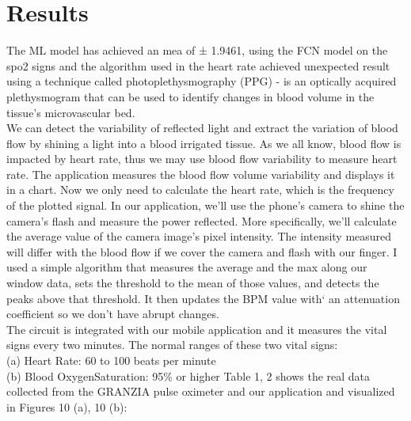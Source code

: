 \documentclass{bmcart}
\begin{document}
\section*{Results}
The ML model has achieved an mea of ± 1.9461, using the FCN model on the spo2
signs and the algorithm used in the heart rate achieved unexpected result using
a technique called photoplethysmography (PPG) - is an optically acquired
plethysmogram that can be used to identify changes in blood volume in the
tissue's microvascular bed.\\
We can detect the variability of reflected light and extract the variation of
blood flow by shining a light into a blood irrigated tissue. As we all know,
blood flow is impacted by heart rate, thus we may use blood flow variability to
measure heart rate. The application measures the blood flow volume variability
and displays it in a chart. Now we only need to calculate the heart rate, which
is the frequency of the plotted signal. In our application, we'll use the
phone's camera to shine the camera's flash and measure the power reflected. More
specifically, we'll calculate the average value of the camera image's pixel
intensity. The intensity measured will differ with the blood flow if we cover
the camera and flash with our finger. I used a simple algorithm that measures
the average and the max along our window data, sets the threshold to the mean of
those values, and detects the peaks above that threshold. It then updates the
BPM value with` an attenuation coefficient so we don't have abrupt changes.\\
The circuit is integrated with our mobile application and it measures the vital
signs every two minutes. The normal ranges of these two vital signs: \\(a) Heart
Rate: 60 to 100 beats per minute \cite{signs} \\(b) Blood OxygenSaturation: 95\%
or higher \cite{olvl} Table 1, 2 shows the real data collected from the GRANZIA
pulse oximeter and our application and visualized in Figures 10 (a), 10 (b):
\end{document}
